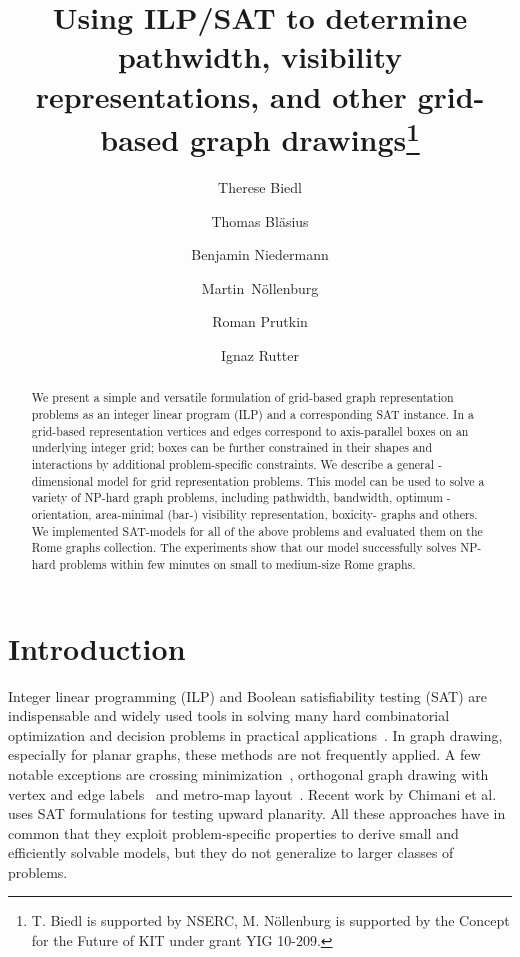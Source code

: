 \documentclass[runningheads]{llncs}
\title{Using ILP/SAT to determine pathwidth, visibility
representations, and other grid-based graph drawings\thanks{T. Biedl
is supported
by NSERC, M. Nöllenburg is supported by the Concept for the Future of
KIT under grant YIG 10-209.}}
\author{Therese Biedl\inst{1}
\and Thomas Bl\"asius\inst{2}
\and Benjamin Niedermann\inst{2}\and Martin~N\"{o}llenburg\inst{2}\and Roman Prutkin\inst{2}\and Ignaz Rutter\inst{2}}
\institute{David R.~Cheriton School of Computer
Science, University of Waterloo, Canada
\and
Institute of Theoretical Informatics, Karlsruhe Institute of
Technology, Germany
}
\newcounter{constr}
\begin{document}
\maketitle
\begin{abstract}
We present a simple and versatile formulation of grid-based graph
representation problems as an integer linear program (ILP) and a
corresponding SAT instance. In a grid-based representation vertices
and edges correspond to axis-parallel boxes on an underlying integer
grid; boxes can be further constrained in their shapes and
interactions by additional problem-specific constraints. We describe a
general -dimensional model for grid representation problems. This
model can be used to solve a variety of  NP-hard graph problems,
including pathwidth, bandwidth, optimum -orientation, 
area-minimal (bar-) visibility representation, boxicity- graphs
and others. We implemented SAT-models for all of the above problems
and evaluated them on the Rome graphs collection. The experiments show
that our model successfully solves NP-hard problems within few minutes
on small to medium-size Rome graphs.
\end{abstract}

\section{Introduction}
Integer linear programming (ILP) and Boolean satisfiability testing
(SAT) are indispensable and widely used tools in solving many hard
combinatorial optimization and decision problems in practical
applications~\cite{bhmw-hs-09,cbd-aip-10}. In graph drawing,
especially for planar graphs, these methods are not frequently
applied. A few notable exceptions
are crossing
minimization~\cite{cmb-aecm-08,bcegjk-bacnp-08,jm-2scmpeha-97,gsm-okpcm-11}, orthogonal graph drawing with vertex and
edge labels~\cite{bdln-odgwvel-05} and metro-map
layout~\cite{nw-dlhqm-11}. Recent work by Chimani et
al.~\cite{cz-upt-13} uses SAT formulations for testing upward
planarity. All these approaches have in common that they exploit
problem-specific properties to derive small and efficiently solvable
models, but they do not generalize to larger classes of problems. 
\end{document}
